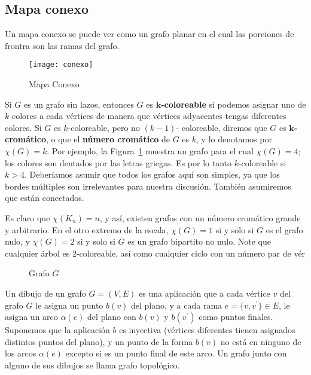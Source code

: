 \documentclass[3p,times,a4paper,twocolumn,authoryear]{elsarticle} %
\begin{document}
\subsection{Mapa conexo}
Un mapa conexo se puede ver como un grafo planar en el cual las porciones de frontra son las ramas del grafo.

\begin{figure}[H]
	\centering
	\texttt{[image: conexo]}
	\caption{Mapa Conexo}
\end{figure}    

Si $G$ es un grafo sin lazos, entonces $G$ es \textbf{$\bm{k}$-coloreable} si podemos asignar uno de $k$ colores a cada vértices de manera que vértices adyacentes tengas diferentes colores. Si $G$ es $k$-coloreable, pero no $(k-1)$- coloreable, diremos que $G$ es \textbf{$\bm{k}$-cromático}, o que el \textbf{número cromático} de $G$ es $k$, y lo denotamos por $\chi(G)=k$. Por ejemplo, la Figura~\ref{fig:1.1} muestra un grafo para el cual $\chi(G)=4$; los colores son dentados por las letras griegas. Es por lo tanto $k$-coloreable si $k>4$. Deberíamos asumir que todos los grafos aquí son simples, ya que los bordes múltiples son irrelevantes para nuestra discusión. También asumiremos que están conectados.

Es claro que $\chi(K_n)=n$, y así, existen grafos con un número cromático grande y arbitrario. En el otro extremo de la escala, $\chi(G)=1$ si y solo si $G$ es el grafo nulo, y $\chi(G)=2$ si y solo si $G$ es un grafo bipartito no nulo. Note que cualquier árbol es $2$-coloreable, así como cualquier ciclo con un número par de vér

\begin{figure}[H]
\centering
\scalebox{0.6}{}
\caption{Grafo $G$}\label{fig:1.1}
\end{figure}

\begin{definition}

Un dibujo de un grafo $G=(V,E)$ es una aplicación que a cada vértice $v$ del grafo $G$ le asigna un punto $b(v)$ del plano, y a cada rama $e=\{v,v^{\prime}\}\in E$, le asigna un arco $\alpha(e)$ del plano con $b(v)$ y $b(v^{\prime})$ como puntos finales. Suponemos que la aplicación $b$ es inyectiva (vértices diferentes tienen asignados distintos puntos del plano), y un punto de la forma $b(v)$ no está en ninguno de los arcos $\alpha(e)$ excepto si es un punto final de este arco. Un grafo junto con alguno de sus dibujos se llama grafo topológico.

\end{definition}
\end{document}
